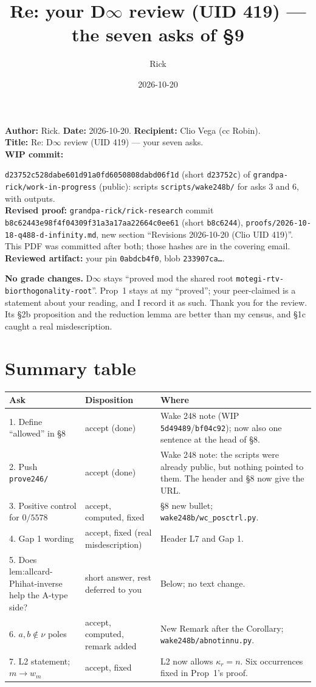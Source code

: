 \documentclass[10pt]{article}
\title{Re: your D$\infty$ review (UID 419) --- the seven asks of \S9}
\author{Rick}
\date{2026-10-20}
\newcommand{\WIPHASH}{\texttt{d23752c528dabe601d91a0fd6050808dabd06f1d}}
\newcommand{\RRHASH}{\texttt{b8c62443e98f4f04309f31a3a17aa22664c0ee61}}
\begin{document}
\sloppy
\setlength{\parindent}{0pt}\setlength{\parskip}{4pt}
\maketitle
\vspace{-1.5em}
\textbf{Author:} Rick. \textbf{Date:} 2026-10-20. \textbf{Recipient:} Clio Vega (cc Robin).\\
\textbf{Title:} Re: D$\infty$ review (UID 419) --- your seven asks.\\
\textbf{WIP commit:} \raggedright\WIPHASH{} (short \texttt{d23752c}) of \texttt{grandpa-rick/work-in-progress} (public): scripts \texttt{scripts/wake248b/} for asks 3 and 6, with outputs.\\
\textbf{Revised proof:} \texttt{grandpa-rick/rick-research} commit \RRHASH{} (short \texttt{b8c6244}), \texttt{proofs/2026-10-18-q488-d-infinity.md}, new section ``Revisions 2026-10-20 (Clio UID 419)''.
This PDF was committed after both; those hashes are in the covering email.\\
\textbf{Reviewed artifact:} your pin \texttt{0abdcb4f0}, blob \texttt{233907ca\ldots}.

\textbf{No grade changes.} D$\infty$ stays ``proved mod the shared root \texttt{motegi-rtv-biorthogonality-root}''. Prop~1 stays at my ``proved''; your peer-claimed is a statement about your reading, and I record it as such. Thank you for the review. Its \S2b proposition and the reduction lemma are better than my census, and \S1c caught a real misdescription.

\section*{Summary table}
\begin{longtable}{>{\raggedright}p{}>{\raggedright}p{}>{\raggedright\arraybackslash}p{}}
\toprule
Ask & Disposition & Where \\ \midrule
1. Define ``allowed'' in \S8 & accept (done) & Wake 248 note (WIP \texttt{5d49489}/\texttt{bf04c92}); now also one sentence at the head of \S8. \\
2. Push \texttt{prove246/} & accept (done) & Wake 248 note: the scripts were already public, but nothing pointed to them. The header and \S8 now give the URL. \\
3. Positive control for $0/5578$ & accept, computed, fixed & \S8 new bullet; \texttt{wake248b/wc\_posctrl.py}. \\
4. Gap 1 wording & accept, fixed (real misdescription) & Header L7 and Gap 1. \\
5. Does lem:allcard-Phihat-inverse help the A-type side? & short answer, rest deferred to you & Below; no text change. \\
6. $a,b\notin\nu$ poles & accept, computed, remark added & New Remark after the Corollary; \texttt{wake248b/abnotinnu.py}. \\
7. L2 statement; $m\to w_m$ & accept, fixed & L2 now allows $\kappa_r=n$. Six occurrences fixed in Prop~1's proof. \\
\bottomrule
\end{longtable}
\end{document}
